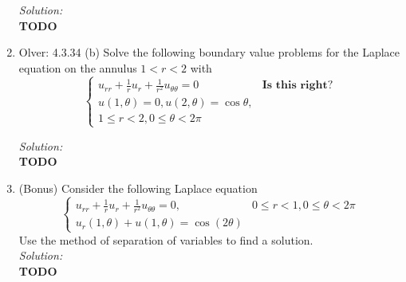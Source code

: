 \documentclass[10pt]{amsart}
\theoremstyle{nonumberplain}
\begin{document}
\begin{enumerate}[label={\bf {\arabic*}:}]
\noindent
\textit{Solution:} \\
\textbf{TODO}

\newpage

\item Olver: 4.3.34 (b) Solve the following boundary value problems for the Laplace equation on the annulus $1 < r < 2$ with
$$
\begin{cases}
u_{rr} + \frac 1 ru_{r} + \frac 1 {r^2} u_{\theta\theta} = 0 &\textbf{Is this right?} \\
u(1, \theta) = 0, u(2, \theta) = \cos \theta, \\
1 \leq r < 2, 0 \leq \theta < 2\pi 
\end{cases}
$$

\noindent
\textit{Solution:} \\
\textbf{TODO}

\newpage


\item (Bonus) Consider the following Laplace equation
$$
\begin{cases}
u_{rr} + \frac 1 ru_{r} + \frac 1 {r^2} u_{\theta\theta} = 0, & 0 \leq r < 1, 0 \leq \theta < 2\pi \\
u_r(1, \theta) + u(1, \theta) = \cos(2 \theta)
\end{cases}
$$
Use the method of separation of variables to find a solution. \\

\noindent
\textit{Solution:} \\
\textbf{TODO}

\newpage

\end{enumerate}
\end{document}
